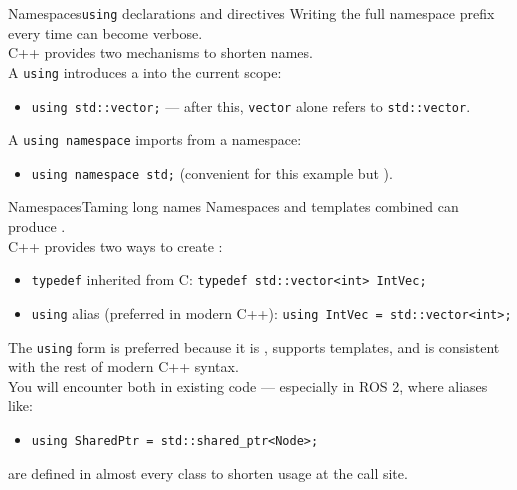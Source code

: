\begin{frame}{Namespaces}{\texttt{using} declarations and directives}
	\justifying
	Writing the full namespace prefix every time can become verbose.\\
	C++ provides two mechanisms to shorten names.\\
	\bigskip
	A \texttt{using}  introduces a  into the current scope:
	\begin{itemize}
		\item \texttt{using std::vector;} — after this, \texttt{vector} alone refers to \texttt{std::vector}.
	\end{itemize}
	\bigskip
	A \texttt{using namespace}  imports  from a namespace:
	\begin{itemize}
		\item \texttt{using namespace std;} (convenient for this example but ).
	\end{itemize}
\end{frame}
\begin{frame}{Namespaces}{Taming long names}
	\justifying
	Namespaces and templates combined can produce .\\
	C++ provides two ways to create :
	\begin{itemize}
		\item \texttt{typedef} inherited from C: \texttt{typedef std::vector<int> IntVec;}
		\item \texttt{using} alias (preferred in modern C++): \texttt{using IntVec = std::vector<int>;}
	\end{itemize}
	\bigskip
	The \texttt{using} form is preferred because it is , supports templates, and is consistent with the rest of modern C++ syntax.\\
	\bigskip
	You will encounter both in existing code — especially in ROS 2, where aliases like:
	\begin{itemize}
		\item \texttt{using SharedPtr = std::shared\_ptr<Node>;}
	\end{itemize}
	are defined in almost every class to shorten usage at the call site.
\end{frame}

